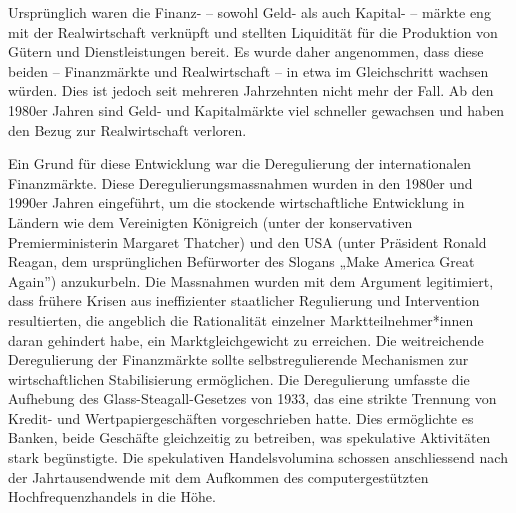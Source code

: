 \documentclass[
  nswissgerman,
  a4paper,
  openany]{book}
\begin{document}
Ursprünglich waren die Finanz- -- sowohl Geld- als auch Kapital- --
märkte eng mit der Realwirtschaft verknüpft und stellten Liquidität für
die Produktion von Gütern und Dienstleistungen bereit. Es wurde daher
angenommen, dass diese beiden -- Finanzmärkte und Realwirtschaft -- in
etwa im Gleichschritt wachsen würden. Dies ist jedoch seit mehreren
Jahrzehnten nicht mehr der Fall. Ab den 1980er Jahren sind Geld- und
Kapitalmärkte viel schneller gewachsen und haben den Bezug zur
Realwirtschaft verloren.

Ein Grund für diese Entwicklung war die Deregulierung der
internationalen Finanzmärkte. Diese Deregulierungsmassnahmen wurden in
den 1980er und 1990er Jahren eingeführt, um die stockende
wirtschaftliche Entwicklung in Ländern wie dem Vereinigten Königreich
(unter der konservativen Premierministerin Margaret Thatcher) und den
USA (unter Präsident Ronald Reagan, dem ursprünglichen Befürworter des
Slogans „Make America Great Again'') anzukurbeln. Die Massnahmen wurden
mit dem Argument legitimiert, dass frühere Krisen aus ineffizienter
staatlicher Regulierung und Intervention resultierten, die angeblich die
Rationalität einzelner Marktteilnehmer*innen daran gehindert habe, ein
Marktgleichgewicht zu erreichen. Die weitreichende Deregulierung der
Finanzmärkte sollte selbstregulierende Mechanismen zur wirtschaftlichen
Stabilisierung ermöglichen. Die Deregulierung umfasste die Aufhebung des
Glass-Steagall-Gesetzes von 1933, das eine strikte Trennung von Kredit-
und Wertpapiergeschäften vorgeschrieben hatte. Dies ermöglichte es
Banken, beide Geschäfte gleichzeitig zu betreiben, was spekulative
Aktivitäten stark begünstigte. Die spekulativen Handelsvolumina schossen
anschliessend nach der Jahrtausendwende mit dem Aufkommen des
computergestützten Hochfrequenzhandels in die Höhe.
\end{document}
